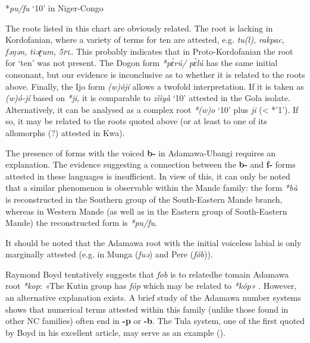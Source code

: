 \begin{table}
\caption{\label{tab:4:38}*\textit{pu/fu} `10' in Niger-Congo}
\kppyramid
{}
 
\end{table}
The roots listed in this chart are obviously related. The root is lacking in Kordofanian, where a variety of terms for ten are attested, e.g. \textit{tu(l),} \textit{rakpac,} \textit{fəŋən,} \textit{tiəɽum,} \textit{5\textsc{pl}.} This probably indicates that in Proto-Kordofanian the root for ‘ten’ was not present. The Dogon form \textit{*p{\'{ɛ}}rú/} \textit{p{\'{ɛ}}lú} has the same initial consonant, but our evidence is inconclusive as to whether it is related to the roots above. Finally, the Ijo form \textit{(w)ójí} allows a twofold interpretation. If it is taken as \textit{(w)ó-jí} based on \textit{*ji}, it is comparable to \textit{zììyà} ‘10’ attested in the Gola isolate. Alternatively, it can be analysed as a complex root \textit{*(w)o} ‘10’ plus \textit{ji} (< *’1’). If so, it may be related to the roots quoted above (or at least to one of its allomorphs (?) attested in Kwa).

The presence of forms with the voiced \textbf{b-} in Adamawa-Ubangi requires an explanation. The evidence suggesting a connection between the \textbf{b-} and \textbf{f-} forms attested in these languages is insufficient. In view of this, it can only be noted that a similar phenomenon is observable within the Mande family: the form \textit{*b{\`{u}}} is reconstructed in the Southern group of the South-Eastern Mande branch, whereas in Western Mande (as well as in the Eastern group of South-Eastern Mande) the reconstructed form is \textit{*pu/fu}. 

It should be noted that the Adamawa root with the initial voiceless labial is only marginally attested (e.g. in Munga (\textit{fuə}) and Pere (\textit{fób})).

Raymond Boyd tentatively suggests that \textit{fob} is to relatedhe  tomain Adamawa root \textit{*kop}: \textit{«}The Kutin group has \textit{fóp} which may be related to \textit{*kóp»} \citep[162]{Boyd1989}. However, an alternative explanation exists. A brief study of the Adamawa number systems shows that numerical terms attested within this family (unlike those found in other NC families) often end in \textbf{-p} or \textbf{-b}. The Tula system, one of the first quoted by Boyd in his excellent article, may serve as an example ().


